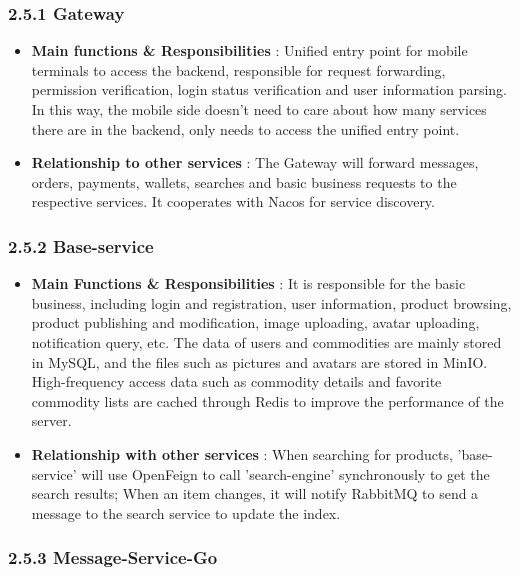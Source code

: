 \documentclass{article}
\begin{document}
\subsubsection{2.5.1 Gateway}

\begin{itemize}
    \item \textbf{ Main functions \& Responsibilities } : Unified entry point for mobile terminals to access the backend, responsible for request forwarding, permission verification, login status verification and user information parsing. In this way, the mobile side doesn't need to care about how many services there are in the backend, only needs to access the unified entry point.
    \item \textbf{ Relationship to other services } : The Gateway will forward messages, orders, payments, wallets, searches and basic business requests to the respective services. It cooperates with Nacos for service discovery.
\end{itemize}

\subsubsection{2.5.2 Base-service}

\begin{itemize}
    \item \textbf{ Main Functions \& Responsibilities } : It is responsible for the basic business, including login and registration, user information, product browsing, product publishing and modification, image uploading, avatar uploading, notification query, etc. The data of users and commodities are mainly stored in MySQL, and the files such as pictures and avatars are stored in MinIO. High-frequency access data such as commodity details and favorite commodity lists are cached through Redis to improve the performance of the server.
    \item \textbf{ Relationship with other services } : When searching for products, 'base-service' will use OpenFeign to call 'search-engine' synchronously to get the search results; When an item changes, it will notify RabbitMQ to send a message to the search service to update the index.
\end{itemize}

\subsubsection{2.5.3 Message-Service-Go}
\end{document}
